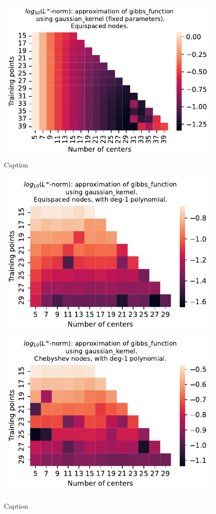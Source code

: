\documentclass[12pt]{report} %
\begin{document}
\begin{figure}[ht]
    \centering
    
    \includegraphics[width=.6\textwidth]{imagenes/experiments/1d/least_squares/gibbs_exact_solution_fucks_up.pdf}
    \caption{Caption}
    \label{fig:gibbs-gaussian-extended-lstsq}
\end{figure}


\begin{figure}[ht]
    \centering
    
    \includegraphics[width=.49\textwidth]{imagenes/experiments/1d/variational/gibbs_function-Kgaussian_kernel-Poly-Equi.pdf}
    \includegraphics[width=.49\textwidth]{imagenes/experiments/1d/variational/gibbs_function-Kgaussian_kernel-Poly-Cheb.pdf}
    \caption{Caption}
    \label{fig:gibbs-gaussian-poly}
\end{figure}
\end{document}
